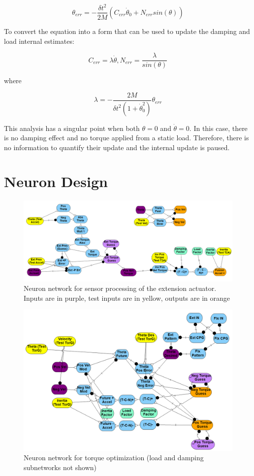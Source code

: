 \documentclass[letterpaper, 10 pt, conference]{IEEEconf} %
\newcommand{\bbs}[1]{\section{#1}}
\begin{document}
\begin{equation}
\theta_{err} = - \dfrac{\delta t^{2}}{2M}(C_{err} \dot{\theta}_{0} + N_{err} sin(\theta))
\end{equation}

To convert the equation into a form that can be used to update the damping and
load internal estimates:

\begin{equation}
C_{err} = \lambda \dot{\theta}, N_{err} = \dfrac{\lambda}{sin(\theta)}
\end{equation}

where

\begin{equation}
\lambda 
=
- \dfrac{2M}{\delta t^{2} (1 + \dot{\theta}_{0}^{2})} \theta_{err}
\end{equation}

This analysis has a singular point when both $\theta = 0$ and $\dot{\theta} = 0$. In this case, there is no damping effect and no torque applied from a static
load. Therefore, there is no information to quantify their update and the internal update is paused.

\bbs{Neuron Design}
\label{chap:neuron_design}

\begin{figure}
\centering
\includegraphics[width=6.5in]{methods/SensorFusion_Ext}
\caption{Neuron network for sensor processing of the extension actuator. Inputs are in purple, test inputs are in yellow, outputs are in orange}
\label{fig:NeuronSensorFusion}
\end{figure}

\begin{figure}
\centering
\includegraphics[width=6.5in]{methods/TorqueOptimization}
\caption{Neuron network for torque optimization (load and damping subnetworks not shown)}
\label{fig:NeuronTorqueOptimization}
\end{figure}
\end{document}
